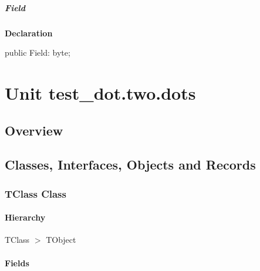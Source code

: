 \documentclass{report}
\begin{document}
\paragraph*{Field}\hspace*{\fill}

\begin{list}{}{
\setlength{\itemindent}{0cm}
\setlength{\listparindent}{0cm}
\setlength{\leftmargin}{\evensidemargin}
\addtolength{\leftmargin}{\tmplength}
\settowidth{\labelsep}{X}
\addtolength{\leftmargin}{\labelsep}
\setlength{\labelwidth}{\tmplength}
}
\begin{flushleft}
\item[\textbf{Declaration}\hfill]
\begin{ttfamily}
public Field: byte;\end{ttfamily}


\end{flushleft}
\end{list}
\chapter{Unit test{\_}dot.two.dots}
\section{Overview}
\begin{description}
\item[\texttt{\begin{ttfamily}TClass\end{ttfamily} Class}]
\end{description}
\section{Classes, Interfaces, Objects and Records}
\subsection*{TClass Class}
\subsubsection*{\large{\textbf{Hierarchy}}\normalsize\hspace{1ex}\hfill}
TClass {$>$} TObject
\subsubsection*{\large{\textbf{Fields}}\normalsize\hspace{1ex}\hfill}
\end{document}

